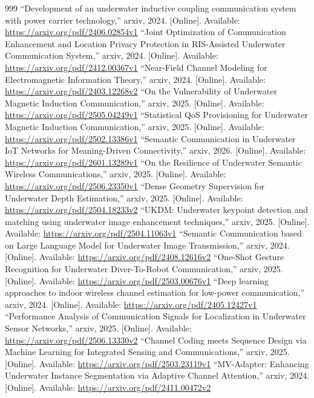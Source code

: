 \documentclass[10pt,journal]{IEEEtran}
\begin{document}
\begin{thebibliography}{999}
 ``Development of an underwater inductive coupling communication system with power carrier technology,'' arxiv, 2024. [Online]. Available: \url{https://arxiv.org/pdf/2406.02854v1}
 ``Joint Optimization of Communication Enhancement and Location Privacy Protection in RIS-Assisted Underwater Communication System,'' arxiv, 2024. [Online]. Available: \url{https://arxiv.org/pdf/2412.00367v1}
 ``Near-Field Channel Modeling for Electromagnetic Information Theory,'' arxiv, 2024. [Online]. Available: \url{https://arxiv.org/pdf/2403.12268v2}
 ``On the Vulnerability of Underwater Magnetic Induction Communication,'' arxiv, 2025. [Online]. Available: \url{https://arxiv.org/pdf/2505.04249v1}
 ``Statistical QoS Provisioning for Underwater Magnetic Induction Communication,'' arxiv, 2025. [Online]. Available: \url{https://arxiv.org/pdf/2502.13386v1}
 ``Semantic Communication in Underwater IoT Networks for Meaning-Driven Connectivity,'' arxiv, 2026. [Online]. Available: \url{https://arxiv.org/pdf/2601.13289v1}
 ``On the Resilience of Underwater Semantic Wireless Communications,'' arxiv, 2025. [Online]. Available: \url{https://arxiv.org/pdf/2506.23350v1}
 ``Dense Geometry Supervision for Underwater Depth Estimation,'' arxiv, 2025. [Online]. Available: \url{https://arxiv.org/pdf/2504.18233v2}
 ``UKDM: Underwater keypoint detection and matching using underwater image enhancement techniques,'' arxiv, 2025. [Online]. Available: \url{https://arxiv.org/pdf/2504.11063v1}
 ``Semantic Communication based on Large Language Model for Underwater Image Transmission,'' arxiv, 2024. [Online]. Available: \url{https://arxiv.org/pdf/2408.12616v2}
 ``One-Shot Gesture Recognition for Underwater Diver-To-Robot Communication,'' arxiv, 2025. [Online]. Available: \url{https://arxiv.org/pdf/2503.00676v1}
 ``Deep learning approaches to indoor wireless channel estimation for low-power communication,'' arxiv, 2024. [Online]. Available: \url{https://arxiv.org/pdf/2405.12427v1}
 ``Performance Analysis of Communication Signals for Localization in Underwater Sensor Networks,'' arxiv, 2025. [Online]. Available: \url{https://arxiv.org/pdf/2506.13330v2}
 ``Channel Coding meets Sequence Design via Machine Learning for Integrated Sensing and Communications,'' arxiv, 2025. [Online]. Available: \url{https://arxiv.org/pdf/2503.23119v1}
 ``MV-Adapter: Enhancing Underwater Instance Segmentation via Adaptive Channel Attention,'' arxiv, 2024. [Online]. Available: \url{https://arxiv.org/pdf/2411.00472v2}

\end{thebibliography}
\end{document}
